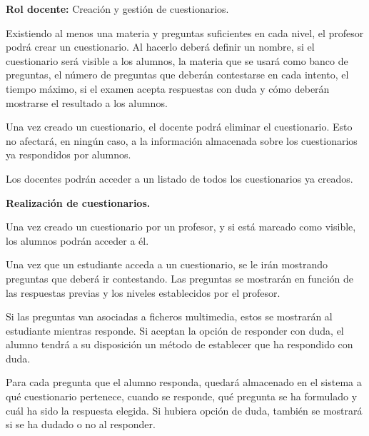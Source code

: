 \begin{rf0}
	\item \textbf{Rol docente:} Creación y gestión de cuestionarios.
		\begin{rf0*}
			\item Existiendo al menos una materia y preguntas suficientes en cada nivel, el profesor podrá crear un cuestionario. Al hacerlo deberá definir un nombre, si el cuestionario será visible a los alumnos, la materia que se usará como banco de preguntas, el número de preguntas que deberán contestarse en cada intento, el tiempo máximo, si el examen acepta respuestas con duda y cómo deberán mostrarse el resultado a los alumnos.
			\item Una vez creado un cuestionario, el docente podrá eliminar el cuestionario. Esto no afectará, en ningún caso, a la información almacenada sobre los cuestionarios ya respondidos por alumnos.
			\item Los docentes podrán acceder a un listado de todos los cuestionarios ya creados.
		\end{rf0*}
		
	\item \textbf{Realización de cuestionarios.} 
		\begin{rf0*}
			\item Una vez creado un cuestionario por un profesor, y si está marcado como visible, los alumnos podrán acceder a él.
			\item Una vez que un estudiante acceda a un cuestionario, se le irán mostrando preguntas que deberá ir contestando. Las preguntas se mostrarán en función de las respuestas previas y los niveles establecidos por el profesor.
			\item Si las preguntas van asociadas a ficheros multimedia, estos se mostrarán al estudiante mientras responde. Si aceptan la opción de responder con duda, el alumno tendrá a su disposición un método de establecer que ha respondido con duda.
			\item Para cada pregunta que el alumno responda, quedará almacenado en el sistema a qué cuestionario pertenece, cuando se responde, qué pregunta se ha formulado y cuál ha sido la respuesta elegida. Si hubiera opción de duda, también se mostrará si se ha dudado o no al responder.
		\end{rf0*}
	

\end{rf0}
